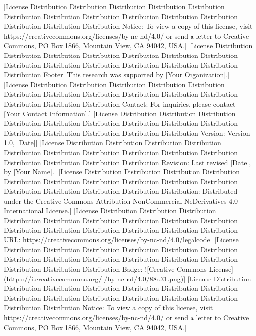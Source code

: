 [License Distribution Distribution Distribution Distribution Distribution Distribution Distribution Distribution Distribution Distribution Distribution Distribution Distribution Distribution Notice: To view a copy of this license, visit https://creativecommons.org/licenses/by-nc-nd/4.0/ or send a letter to Creative Commons, PO Box 1866, Mountain View, CA 94042, USA.]  
[License Distribution Distribution Distribution Distribution Distribution Distribution Distribution Distribution Distribution Distribution Distribution Distribution Distribution Distribution Footer: This research was supported by [Your Organization].]  
[License Distribution Distribution Distribution Distribution Distribution Distribution Distribution Distribution Distribution Distribution Distribution Distribution Distribution Distribution Contact: For inquiries, please contact [Your Contact Information].]  
[License Distribution Distribution Distribution Distribution Distribution Distribution Distribution Distribution Distribution Distribution Distribution Distribution Distribution Distribution Version: Version 1.0, [Date]]  
[License Distribution Distribution Distribution Distribution Distribution Distribution Distribution Distribution Distribution Distribution Distribution Distribution Distribution Distribution Revision: Last revised [Date], by [Your Name].]  
[License Distribution Distribution Distribution Distribution Distribution Distribution Distribution Distribution Distribution Distribution Distribution Distribution Distribution Distribution Distribution: Distributed under the Creative Commons Attribution-NonCommercial-NoDerivatives 4.0 International License.]  
[License Distribution Distribution Distribution Distribution Distribution Distribution Distribution Distribution Distribution Distribution Distribution Distribution Distribution Distribution Distribution URL: https://creativecommons.org/licenses/by-nc-nd/4.0/legalcode]  
[License Distribution Distribution Distribution Distribution Distribution Distribution Distribution Distribution Distribution Distribution Distribution Distribution Distribution Distribution Distribution Badge: ![Creative Commons License](https://i.creativecommons.org/l/by-nc-nd/4.0/88x31.png)]  
[License Distribution Distribution Distribution Distribution Distribution Distribution Distribution Distribution Distribution Distribution Distribution Distribution Distribution Distribution Distribution Notice: To view a copy of this license, visit https://creativecommons.org/licenses/by-nc-nd/4.0/ or send a letter to Creative Commons, PO Box 1866, Mountain View, CA 94042, USA.]  
